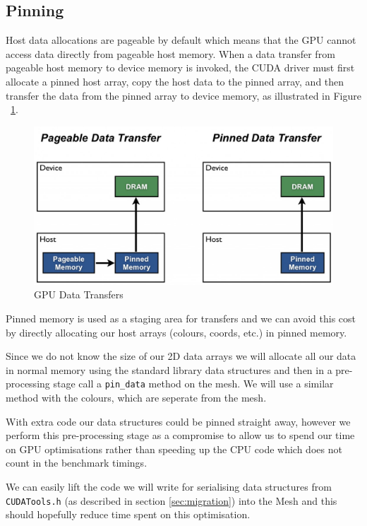 \subsection{Pinning}
Host data allocations are pageable by default which means that the GPU cannot access data directly from pageable host memory. When a data transfer from pageable host memory to device memory is invoked, the CUDA driver must first allocate a pinned host array, copy the host data to the pinned array, and then transfer the data from the pinned array to device memory\cite{transfer}, as illustrated in Figure ~\ref{fig:pinning}.
\begin{figure}[H]
  \centering
  \includegraphics[scale=0.3]{images/pinning}
  \caption[pinning]{GPU Data Transfers\cite{transfer}}
  \label{fig:pinning}
\end{figure}
Pinned memory is used as a staging area for transfers and we can avoid this cost by directly allocating our host arrays (colours, coords, etc.) in pinned memory.

Since we do not know the size of our 2D data arrays we will allocate all our data in normal memory using the standard library data structures and then in a pre-processing stage call a \verb!pin_data! method on the mesh. We will use a similar method with the colours, which are seperate from the mesh.

With extra code our data structures could be pinned straight away, however we perform this pre-processing stage as a compromise to allow us to spend our time on GPU optimisations rather than speeding up the CPU code which does not count in the benchmark timings.

We can easily lift the code we will write for serialising data structures from \verb!CUDATools.h! (as described in section \ref{sec:migration}) into the Mesh and this should hopefully reduce time spent on this optimisation.